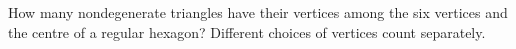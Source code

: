 How many nondegenerate triangles have their vertices among the six vertices and the centre of a regular hexagon? Different choices of vertices count separately.
